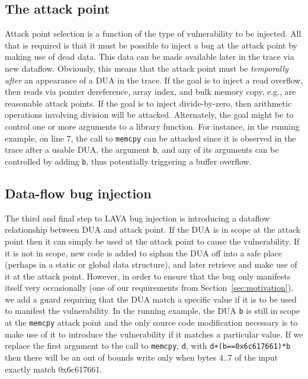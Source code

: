 \subsection {The attack point}

Attack point selection is a function of the type of vulnerability to be injected.
All that is required is that it must be possible to inject a bug at the attack point by making use of dead data.
This data can be made available later in the trace via new dataflow.
Obviously, this means that the attack point must be \emph{temporally after} an appearance of a DUA in the trace.
If the goal is to inject a read overflow, then reads via pointer dereference, array index, and bulk memory copy, e.g., are reasonable attack points.  
If the goal is to inject divide-by-zero, then arithmetic operations involving division will be attacked. 
Alternately, the goal might be to control one or more arguments to a library function.
For instance, in the running example, on line 7, the call to \verb+memcpy+ can be attacked since it is observed in the trace after a usable DUA, the argument \verb+b+, and any of its arguments can be controlled by adding \verb+b+, thus potentially triggering a buffer overflow. 

\subsection {Data-flow bug injection}

The third and final step to LAVA bug injection is introducing a dataflow relationship between DUA and attack point.  
If the DUA is in scope at the attack point then it can simply be used at the attack point to cause the vulnerability.
If it is not in scope, new code is added to siphon the DUA off into a safe place (perhaps in a static or global data structure), and later retrieve and make use of it at the attack point. 
However, in order to ensure that the bug only manifests itself very occasionally (one of our requirements from Section~\ref{sec:motivation}), we add a guard requiring that the DUA match a specific value if it is to be used to manifest the vulnerability.
In the running example, the DUA \verb+b+ is still in scope at the \verb+memcpy+ attack point and the only source code modification necessary is to make use of it to introduce the vulnerability if it matches a particular value.  
If we replace the first argument to the call to \verb+memcpy+, \verb+d+, with \verb-d+(b==0x6c617661)*b- then there will be an out of bounds write only when bytes 4..7 of the input exactly match 0x6c617661. 

